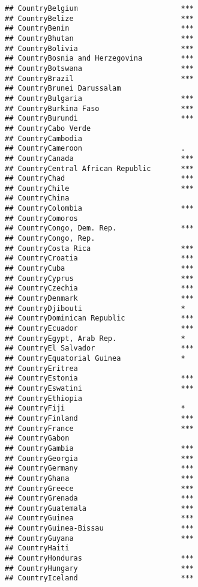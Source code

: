 \documentclass[
]{article}
\begin{document}
\begin{verbatim}
## CountryBelgium                        ***
## CountryBelize                         ***
## CountryBenin                          ***
## CountryBhutan                         ***
## CountryBolivia                        ***
## CountryBosnia and Herzegovina         ***
## CountryBotswana                       ***
## CountryBrazil                         ***
## CountryBrunei Darussalam                 
## CountryBulgaria                       ***
## CountryBurkina Faso                   ***
## CountryBurundi                        ***
## CountryCabo Verde                        
## CountryCambodia                          
## CountryCameroon                       .  
## CountryCanada                         ***
## CountryCentral African Republic       ***
## CountryChad                           ***
## CountryChile                          ***
## CountryChina                             
## CountryColombia                       ***
## CountryComoros                           
## CountryCongo, Dem. Rep.               ***
## CountryCongo, Rep.                       
## CountryCosta Rica                     ***
## CountryCroatia                        ***
## CountryCuba                           ***
## CountryCyprus                         ***
## CountryCzechia                        ***
## CountryDenmark                        ***
## CountryDjibouti                       *  
## CountryDominican Republic             ***
## CountryEcuador                        ***
## CountryEgypt, Arab Rep.               *  
## CountryEl Salvador                    ***
## CountryEquatorial Guinea              *  
## CountryEritrea                           
## CountryEstonia                        ***
## CountryEswatini                       ***
## CountryEthiopia                          
## CountryFiji                           *  
## CountryFinland                        ***
## CountryFrance                         ***
## CountryGabon                             
## CountryGambia                         ***
## CountryGeorgia                        ***
## CountryGermany                        ***
## CountryGhana                          ***
## CountryGreece                         ***
## CountryGrenada                        ***
## CountryGuatemala                      ***
## CountryGuinea                         ***
## CountryGuinea-Bissau                  ***
## CountryGuyana                         ***
## CountryHaiti                             
## CountryHonduras                       ***
## CountryHungary                        ***
## CountryIceland                        ***

\end{verbatim}
\end{document}
